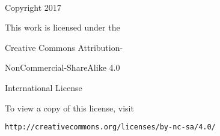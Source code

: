 \doublespacing

\vspace*{\fill}

\thetitle \\

\textcopyright \hspace{10pt} Copyright 2017

\theauthor

This work is licensed under the

Creative Commons Attribution-

NonCommercial-ShareAlike 4.0

International License

To view a copy of this license, visit

{\tt http://creativecommons.org/licenses/by-nc-sa/4.0/}
\thispagestyle{empty}
